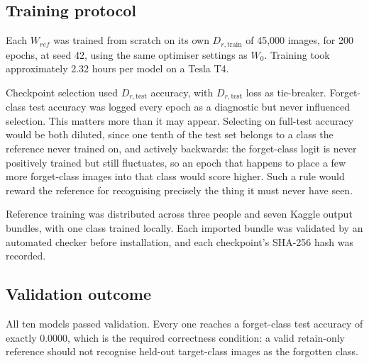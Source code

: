 \subsection{Training protocol}

Each $W_{ref}$ was trained from scratch on its own $D_{r,\text{train}}$ of 45{,}000
images, for 200 epochs, at seed 42, using the same optimiser settings as $W_0$.
Training took approximately 2.32 hours per model on a Tesla T4.

Checkpoint selection used $D_{r,\text{test}}$ accuracy, with $D_{r,\text{test}}$
loss as tie-breaker. Forget-class test accuracy was logged every epoch as a
diagnostic but never influenced selection. This matters more than it may appear.
Selecting on full-test accuracy would be both diluted, since one tenth of the test
set belongs to a class the reference never trained on, and actively backwards: the
forget-class logit is never positively trained but still fluctuates, so an epoch
that happens to place a few more forget-class images into that class would score
higher. Such a rule would reward the reference for recognising precisely the thing
it must never have seen.

Reference training was distributed across three people and seven Kaggle output
bundles, with one class trained locally. Each imported bundle was validated by an
automated checker before installation, and each checkpoint's SHA-256 hash was
recorded.

\subsection{Validation outcome}

\begin{table}[htbp]
  \centering
  \caption{Retain-only reference models for all ten CIFAR-10 classes. Each model
  was trained on $D_{r,\text{train}}$ only. Forget-class test accuracy is 0.0000
  for all ten, which is the correctness condition rather than a result.}
  \label{tab:reference-validation}
\end{table}

All ten models passed validation. Every one reaches a forget-class test accuracy
of exactly 0.0000, which is the required correctness condition: a valid
retain-only reference should not recognise held-out target-class images as the
forgotten class.

